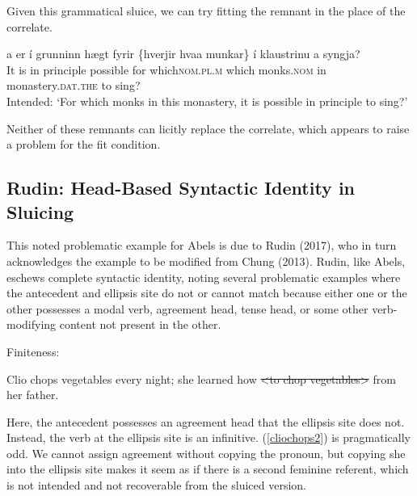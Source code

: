 \documentclass{turabian-researchpaper}
\begin{document}
Given this grammatical sluice, we can try fitting the remnant in the place of the correlate. 

\begin{exe}
\ex\label{monksis3}
\gll \TH a{\dh} er \'i  grunninn h\ae gt fyrir \{hverjir \textbar hva\dh a munkar\} \'i klaustrinu a{\dh} syngja? \\
It is in principle possible for which\textsc{nom.pl.m} which monks.\textsc{nom}  in monastery.\textsc{dat.the}  to   sing? \\ 
\trans Intended: `For which monks in this monastery, it is possible in principle to sing?'
\end{exe}

Neither of these remnants can licitly replace the correlate, which appears to raise a problem for the fit condition. 

\subsection{Rudin: Head-Based Syntactic Identity in Sluicing}

This noted problematic example for Abels is due to Rudin (2017), who in turn acknowledges the example to be modified from Chung (2013). Rudin, like Abels, eschews complete syntactic identity, noting several problematic examples where the antecedent and ellipsis site do not or cannot match because either one or the other possesses a modal verb, agreement head, tense head, or some other verb-modifying content not present in the other.  

Finiteness: 
\begin{exe}
\ex\label{clio1} 
\begin{xlist}
\ex \label{cliochops1}Clio chops vegetables every night; she learned how \sout{\textless to chop vegetables\textgreater} from her father. 
\end{xlist}
\end{exe}

Here, the antecedent possesses an agreement head that the ellipsis site does not. Instead, the verb at the ellipsis site is an infinitive. (\ref{cliochops2}) is pragmatically odd. We cannot assign agreement without copying the pronoun, but copying she into the ellipsis site makes it seem as if there is a second feminine referent, which is not intended and not recoverable from the sluiced version.  
\end{document}
